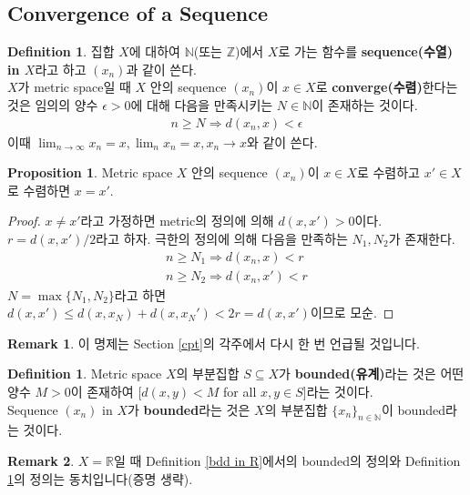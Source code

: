 \documentclass[12pt]{article}
\theoremstyle{definition}
\newtheorem{prop}[thm]{Proposition}
\newtheorem{defn}[thm]{Definition}
\newtheorem*{rem}{Remark}
\def\NN{\mathbb{N}}
\def\ZZ{\mathbb{Z}}
\def\RR{\mathbb{R}}
\def\eps{\epsilon}
\begin{document}
\subsection{Convergence of a Sequence}

	\begin{defn} \label{converge}
		집합 \(X\)에 대하여 \(\NN\)(또는 \(\ZZ\))에서 \(X\)로 가는 함수를 \textbf{sequence(수열) in \(X\)}라고 하고 \((x_n)\)과 같이 쓴다.\\
		\(X\)가 metric space일 때 \(X\) 안의 sequence \((x_n)\)이 \(x \in X\)로 \textbf{converge(수렴)}한다는 것은 임의의 양수 \(\eps > 0\)에 대해 다음을 만족시키는 \(N \in \NN\)이 존재하는 것이다.
		\begin{gather*}
			n \ge N \Longrightarrow d(x_n, x) < \eps
		\end{gather*}
		이때 \(\lim_{n \rightarrow \infty}x_n = x, \lim_n x_n = x, x_n \rightarrow x\)와 같이 쓴다.
	\end{defn}

	\begin{prop}
		Metric space \(X\) 안의 sequence \((x_n)\)이 \(x \in X\)로 수렴하고 \(x' \in X\)로 수렴하면 \(x = x'\).
	\end{prop}
	\begin{proof}
		\(x \neq x'\)라고 가정하면 metric의 정의에 의해 \(d(x, x') > 0\)이다. \(r = d(x, x') / 2\)라고 하자. 극한의 정의에 의해 다음을 만족하는 \(N_1, N_2\)가 존재한다.
		\begin{gather*}
			n \ge N_1 \Longrightarrow d(x_n, x) < r\\
			n \ge N_2 \Longrightarrow d(x_n, x') < r
		\end{gather*}
		\(N = \max\{N_1, N_2\}\)라고 하면 \(d(x, x') \le d(x, x_N) + d(x, x_N') < 2r = d(x, x')\)이므로 모순.
	\end{proof}

	\begin{rem}
		이 명제는 Section \ref{cpt}의 각주에서 다시 한 번 언급될 것입니다.
	\end{rem}

	\begin{defn} \label{bdd}
		Metric space \(X\)의 부분집합 \(S \subseteq X\)가 \textbf{bounded(유계)}라는 것은 어떤 양수 \(M > 0\)이 존재하여 [\(d(x, y) < M\) for all \(x, y \in S\)]라는 것이다.\\
		Sequence \((x_n)\) in \(X\)가 \textbf{bounded}라는 것은 \(X\)의 부분집합 \(\{x_n\}_{n \in \NN}\)이 bounded라는 것이다.
	\end{defn}
	
	\begin{rem}
		\(X = \RR\)일 때 Definition \ref{bdd in R}에서의 bounded의 정의와 Definition \ref{bdd}의 정의는 동치입니다(증명 생략).
	\end{rem}
\end{document}
